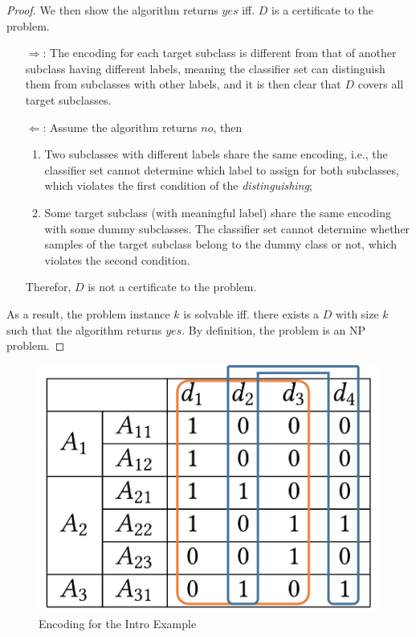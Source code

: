 \documentclass[sigplan,10pt,review]{acmart}\settopmatter{printfolios=true,printccs=false,printacmref=false}
\begin{document}
\begin{proof}
We then show the algorithm returns $yes$ iff. $D$ is a certificate to the problem.
\begin{enumerate}
	\item[$\Rightarrow$:]
	The encoding for each target subclass is different from that of another subclass having different labels, meaning the classifier set can distinguish them from subclasses with other labels, and it is then clear that $D$ covers all target subclasses.
	\item[$\Leftarrow$:]
	Assume the algorithm returns $no$, then
	\begin{enumerate}
		\item Two subclasses with different labels share the same encoding, i.e., the classifier set cannot determine which label to assign for both subclasses, which violates the first condition of the \textit{distinguishing};
		\item Some target subclass (with meaningful label) share the same encoding with some dummy subclasses.
		The classifier set cannot determine whether samples of the target subclass belong to the dummy class or not, which violates the second condition.
	\end{enumerate}
	Therefor, $D$ is not a certificate to the problem.
\end{enumerate}
As a result, the problem instance $k$ is solvable iff. there exists a $D$ with size $k$ such that the algorithm returns $yes$.
By definition, the problem is an NP problem.
\end{proof}

\begin{figure}[h]
	\centering
	\includegraphics[width=0.55\linewidth]{fig/encoding_example.png}
	\caption{Encoding for the Intro Example}
	\label{fig:assemble-example-encoding}
\end{figure}
\end{document}
